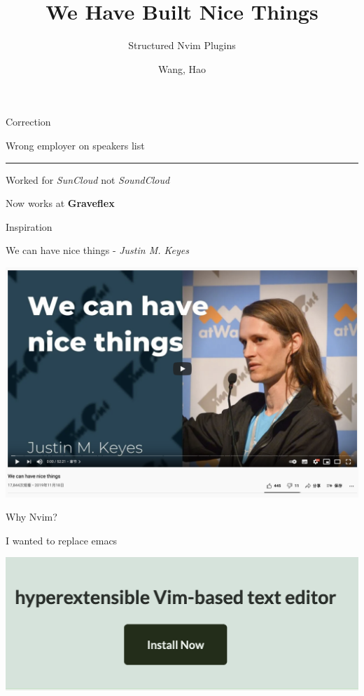 \documentclass{beamer}
\title{We Have Built Nice Things}
\subtitle{Structured Nvim Plugins}
\author{Wang, Hao}
\institute{Lead Engineer @ Graveflex | ms-jpq @ github | hola@bigly.dog}
\date{}
\begin{document}
\begin{frame}


	\titlepage

\end{frame}


\begin{frame}{Correction}

	Wrong employer on speakers list

	\rule{\textwidth}{0.1em}

	Worked for \textit{SunCloud} not \textit{SoundCloud}

	\hspace{0.1em}

	Now works at \textbf{Graveflex}

\end{frame}


\begin{frame}{Inspiration}

	We can have nice things - \textit{Justin M. Keyes}

	\vspace{1em}

	\includegraphics[width=\textwidth]{we_can_have_nice}

\end{frame}


\begin{frame}{Why Nvim?}

	I wanted to replace emacs

	\vspace{1em}

	\includegraphics[width=\textwidth]{home_page}

	\vspace{1em}

\end{frame}
\end{document}
